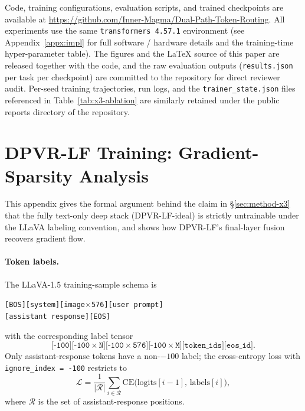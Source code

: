 \documentclass[a4paper,fleqn,review]{cas-sc}
\newcommand{\dpvrlf}{DPVR-LF}
\newcommand{\dpvrlfideal}{DPVR-LF-ideal}
\begin{document}
Code, training configurations, evaluation scripts, and trained
checkpoints are available at
\url{https://github.com/Inner-Magma/Dual-Path-Token-Routing}.
All experiments use the same \texttt{transformers 4.57.1}
environment (see Appendix~\ref{appx:impl} for full software /
hardware details and the training-time hyper-parameter table).
The figures and the \LaTeX{} source of this paper are released
together with the code, and the raw evaluation outputs
(\texttt{results.json} per task per checkpoint) are committed to
the repository for direct reviewer audit. Per-seed training
trajectories, run logs, and the
\texttt{trainer\_state.json}
files referenced in Table~\ref{tab:x3-ablation} are similarly
retained under the public reports directory of the repository.





\appendix

\section{\dpvrlf{} Training: Gradient-Sparsity Analysis}\label{appx:x3-train}

This appendix gives the formal argument behind the claim in
\S\ref{sec:method-x3} that the fully text-only deep stack
(\dpvrlfideal{}) is strictly untrainable under the LLaVA labeling
convention, and shows how \dpvrlf{}'s final-layer fusion recovers
gradient flow.

\paragraph{Token labels.}
The LLaVA-1.5 training-sample schema is
\begin{center}
\small
\texttt{[BOS][system][image$\times$576][user prompt]}\\
\texttt{[assistant response][EOS]}
\end{center}
with the corresponding label tensor
\[
\texttt{[-100][-100$\times$N][-100$\times$576][-100$\times$M][token\_ids][eos\_id]}.
\]
Only assistant-response tokens have a non-$-100$ label; the
cross-entropy loss with \texttt{ignore\_index = -100} restricts to
\begin{equation*}
\mathcal{L} = \frac{1}{|\mathcal{R}|}
\sum_{i \in \mathcal{R}}
\mathrm{CE}\bigl(\mathrm{logits}[i-1],\, \mathrm{labels}[i]\bigr),
\end{equation*}
where $\mathcal{R}$ is the set of assistant-response positions.
\end{document}
